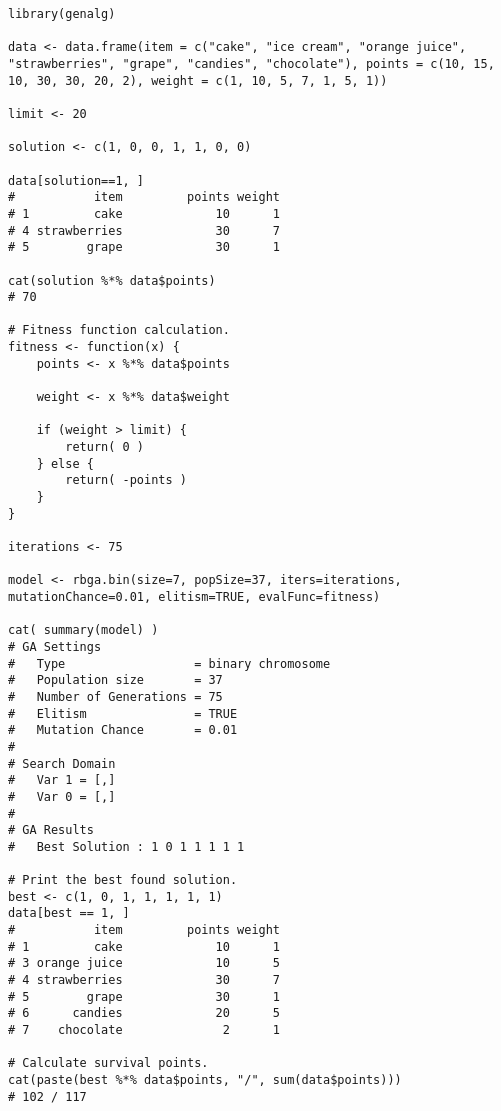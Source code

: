 \begin{lstlisting}[caption=Оптимизация на задачата за раницата с генетични алгоритми, label=listing0176]
library(genalg)

data <- data.frame(item = c("cake", "ice cream", "orange juice", "strawberries", "grape", "candies", "chocolate"), points = c(10, 15, 10, 30, 30, 20, 2), weight = c(1, 10, 5, 7, 1, 5, 1))

limit <- 20

solution <- c(1, 0, 0, 1, 1, 0, 0)

data[solution==1, ]
#           item         points weight
# 1         cake             10      1
# 4 strawberries             30      7
# 5        grape             30      1

cat(solution %*% data$points)
# 70

# Fitness function calculation.
fitness <- function(x) {
	points <- x %*% data$points

	weight <- x %*% data$weight

	if (weight > limit) {
		return( 0 )
	} else {
		return( -points )
	}
}

iterations <- 75

model <- rbga.bin(size=7, popSize=37, iters=iterations, mutationChance=0.01, elitism=TRUE, evalFunc=fitness)

cat( summary(model) )
# GA Settings
#   Type                  = binary chromosome
#   Population size       = 37
#   Number of Generations = 75
#   Elitism               = TRUE
#   Mutation Chance       = 0.01
# 
# Search Domain
#   Var 1 = [,]
#   Var 0 = [,]
# 
# GA Results
#   Best Solution : 1 0 1 1 1 1 1 

# Print the best found solution.
best <- c(1, 0, 1, 1, 1, 1, 1)
data[best == 1, ]
#           item         points weight
# 1         cake             10      1
# 3 orange juice             10      5
# 4 strawberries             30      7
# 5        grape             30      1
# 6      candies             20      5
# 7    chocolate              2      1

# Calculate survival points.
cat(paste(best %*% data$points, "/", sum(data$points)))
# 102 / 117
\end{lstlisting}

